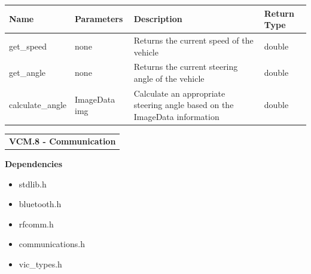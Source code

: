\documentclass [10pt]{article}
\begin{document}
\begin{longtable}{ p{ }  p{ } p{} p{}} \\ 

\rowcolor{tableCell} \textbf{Name} & \textbf{Parameters} & \textbf{Description} &\textbf{Return Type} \\ \hline

\rowcolor{tableCell} get\_speed & none &  Returns the current speed of the vehicle & double \\ \hline
\rowcolor{tableCell} get\_angle & none &   Returns the current steering angle of the vehicle & double \\ \hline
\rowcolor{tableCell} calculate\_angle & ImageData img & Calculate an appropriate steering angle based on the ImageData information & double \\ \hline


\end{longtable}

 





\begin{longtable}{p{}}
\rowcolor{subsectionC}\textbf{VCM.8 - Communication} \\
\end{longtable}


\textbf{Dependencies} 
\begin{itemize} 
\itemsep 0em 
\item stdlib.h
\item bluetooth.h
\item rfcomm.h
\item communications.h
\item vic\_types.h
\end{itemize}
\end{document}
